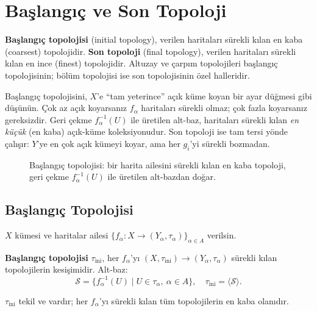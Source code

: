 \chapter{Başlangıç ve Son Topoloji}
\label{ch:initial_final}

\textbf{Başlangıç topolojisi} (initial topology), verilen haritaları sürekli kılan en
kaba (coarsest) topolojidir. \textbf{Son topoloji} (final topology), verilen haritaları
sürekli kılan en ince (finest) topolojidir. Altuzay ve çarpım topolojileri başlangıç
topolojisinin; bölüm topolojisi ise son topolojisinin özel halleridir.

\begin{sezgi}
Başlangıç topolojisini, $X$'e ``tam yeterince'' açık küme koyan bir ayar düğmesi
gibi düşünün. Çok az açık koyarsanız $f_\alpha$ haritaları sürekli olmaz; çok fazla
koyarsanız gereksizdir. Geri çekme $f_\alpha^{-1}(U)$ ile üretilen alt-baz,
haritaları sürekli kılan \emph{en küçük} (en kaba) açık-küme koleksiyonudur. Son
topoloji ise tam tersi yönde çalışır: $Y$'ye en çok açık kümeyi koyar, ama her
$g_i$'yi sürekli bozmadan.
\end{sezgi}

\begin{figure}[ht]
\centering

\caption{Başlangıç topolojisi: bir harita ailesini sürekli kılan en kaba topoloji,
geri çekme $f_\alpha^{-1}(U)$ ile üretilen alt-bazdan doğar.}
\label{fig:ch13_baslangic}
\end{figure}

\section{Başlangıç Topolojisi}
\label{sec:initial}

$X$ kümesi ve haritalar ailesi $\{f_\alpha : X \to (Y_\alpha, \tau_\alpha)\}_{\alpha \in A}$
verilsin.

\begin{definition}
\label{def:initial_topology}
\textbf{Başlangıç topolojisi} $\tau_{\mathrm{ini}}$, her $f_\alpha$'yı $(X, \tau_{\mathrm{ini}}) \to (Y_\alpha, \tau_\alpha)$
sürekli kılan topolojilerin kesişimidir. Alt-baz:
\[
\mathcal{S} = \{f_\alpha^{-1}(U) \mid U \in \tau_\alpha,\ \alpha \in A\},
\quad
\tau_{\mathrm{ini}} = \langle \mathcal{S} \rangle.
\]
\end{definition}

\begin{theorem}
\label{thm:initial_exists}
$\tau_{\mathrm{ini}}$ tekil ve vardır; her $f_\alpha$'yı sürekli kılan tüm topolojilerin
en kaba olanıdır.
\end{theorem}

